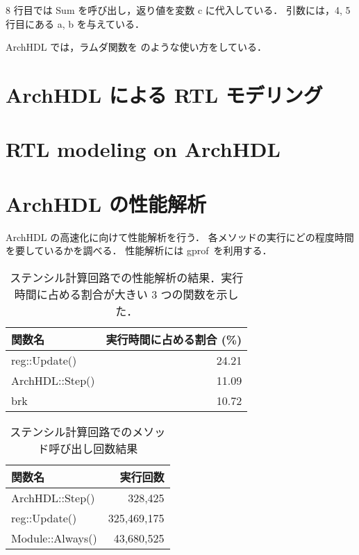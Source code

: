 8 行目では Sum を呼び出し，返り値を変数 c に代入している． 引数には，4,
5 行目にある a, b を与えている．

ArchHDL では，ラムダ関数を 
のような使い方をしている．

\section{ArchHDL による RTL モデリング \label{ss:modeling}}



\fi

\section{RTL modeling on ArchHDL}




\section{ArchHDL の性能解析 \label{ss:profiling}}

ArchHDL の高速化に向けて性能解析を行う．
各メソッドの実行にどの程度時間を要しているかを調べる．
性能解析には gprof~\cite{gprof}を利用する．

\begin{table}[t]
 \caption{ステンシル計算回路での性能解析の結果．実行時間に占める割合が大きい 3 つの関数を示した．}
 \label{table:stencil_prof}
 \begin{center}
  \begin{tabular}{l|r} \hline
  関数名 & 実行時間に占める割合 (\%) \\ \hline
  reg::Update() & 24.21 \\
  ArchHDL::Step() & 11.09 \\
  brk & 10.72 \\ \hline
  \end{tabular}
 \end{center}
\end{table}

\begin{table}[t]
 \caption{ステンシル計算回路でのメソッド呼び出し回数結果}
 \label{table:stencil_method_call_count}
 \begin{center}
  \begin{tabular}{l|r} \hline
  関数名 & 実行回数 \\ \hline
  ArchHDL::Step()   &     328,425 \\
  reg::Update()     & 325,469,175 \\
  Module::Always()  &  43,680,525 \\ \hline
  \end{tabular}
 \end{center}
\end{table}

